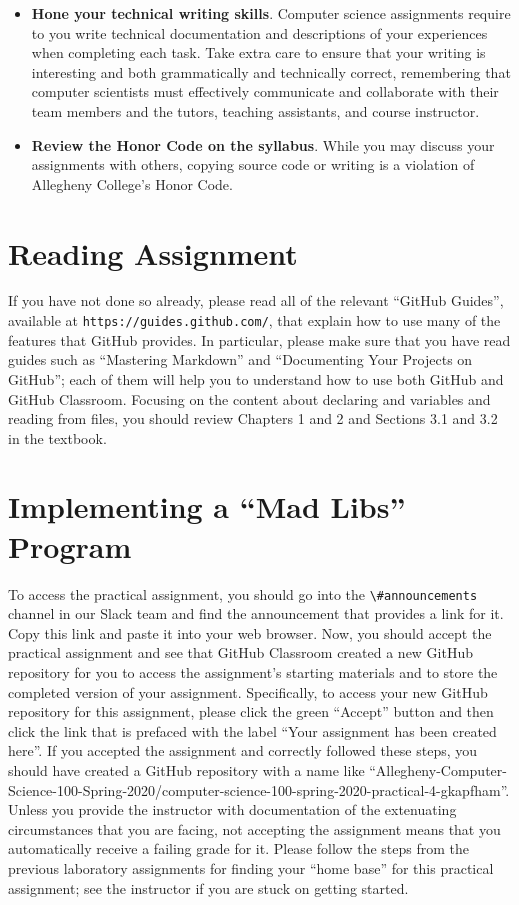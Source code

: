 \documentclass[11pt]{article}
\newcommand{\url}[1]{\lstinline{#1}}
\newcommand{\channel}[1]{\lstinline{#1}}
\begin{document}
\begin{itemize}
\item {\bf Hone your technical writing skills}. Computer science assignments
  require to you write technical documentation and descriptions of your
  experiences when completing each task. Take extra care to ensure that your
  writing is interesting and both grammatically and technically correct,
  remembering that computer scientists must effectively communicate and
  collaborate with their team members and the tutors, teaching assistants, and
  course instructor.

\item {\bf Review the Honor Code on the syllabus}. While you may discuss your
  assignments with others, copying source code or writing is a violation of
  Allegheny College's Honor Code.

\end{itemize}

\section*{Reading Assignment}

If you have not done so already, please read all of the relevant ``GitHub
Guides'', available at \url{https://guides.github.com/}, that explain how to use
many of the features that GitHub provides. In particular, please make sure that
you have read guides such as ``Mastering Markdown'' and ``Documenting Your
Projects on GitHub''; each of them will help you to understand how to use both
GitHub and GitHub Classroom. Focusing on the content about declaring and
variables and reading from files, you should review Chapters 1 and 2 and
Sections 3.1 and 3.2 in the textbook.

\section*{Implementing a ``Mad Libs'' Program}

To access the practical assignment, you should go into the
\channel{\#announcements} channel in our Slack team and find the announcement
that provides a link for it. Copy this link and paste it into your web browser.
Now, you should accept the practical assignment and see that GitHub Classroom
created a new GitHub repository for you to access the assignment's starting
materials and to store the completed version of your assignment. Specifically,
to access your new GitHub repository for this assignment, please click the green
``Accept'' button and then click the link that is prefaced with the label ``Your
assignment has been created here''. If you accepted the assignment and correctly
followed these steps, you should have created a GitHub repository with a name
like
``Allegheny-Computer-Science-100-Spring-2020/computer-science-100-spring-2020-practical-4-gkapfham''.
Unless you provide the instructor with documentation of the extenuating
circumstances that you are facing, not accepting the assignment means that you
automatically receive a failing grade for it. Please follow the steps from the
previous laboratory assignments for finding your ``home base'' for this
practical assignment; see the instructor if you are stuck on getting started.
\end{document}
